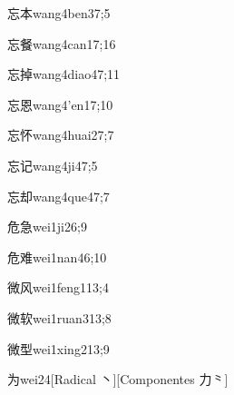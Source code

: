\begin{verbete}{忘本}{wang4ben3}{7;5}
\end{verbete}

\begin{verbete}{忘餐}{wang4can1}{7;16}
\end{verbete}

\begin{verbete}{忘掉}{wang4diao4}{7;11}
\end{verbete}

\begin{verbete}{忘恩}{wang4'en1}{7;10}
\end{verbete}

\begin{verbete}{忘怀}{wang4huai2}{7;7}
\end{verbete}

\begin{verbete}{忘记}{wang4ji4}{7;5}
\end{verbete}

\begin{verbete}{忘却}{wang4que4}{7;7}
\end{verbete}

\begin{verbete}{危急}{wei1ji2}{6;9}
\end{verbete}

\begin{verbete}{危难}{wei1nan4}{6;10}
\end{verbete}

\begin{verbete}{微风}{wei1feng1}{13;4}
\end{verbete}

\begin{verbete}{微软}{wei1ruan3}{13;8}
\end{verbete}

\begin{verbete}{微型}{wei1xing2}{13;9}
\end{verbete}

\begin{verbete}{为}{wei2}{4}[Radical 丶][Componentes 力⺀]
\end{verbete}

